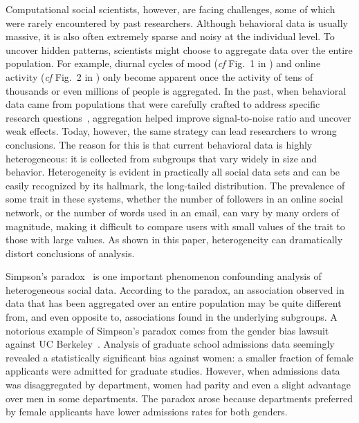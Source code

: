 \documentclass{svjour3}
\begin{document}
Computational social scientists, however, are facing challenges, some of which were rarely encountered by past researchers. %
Although behavioral data is usually massive, it is also often extremely sparse and noisy at the individual level. To uncover hidden patterns, %
scientists might choose to aggregate data over the entire population. For example, diurnal cycles of mood (\emph{cf} Fig.~1 in \cite{golder2011diurnal}) and online activity (\emph{cf} Fig.~2 in \cite{Hogg12epj}) only become apparent once the activity of tens of thousands or even millions of people is aggregated.
In the past, when behavioral data came from populations that were carefully crafted to address specific research questions~\cite{mcfarland2016sociology}, aggregation helped improve signal-to-noise ratio and uncover weak effects.
Today, however, the same strategy can lead researchers to wrong conclusions.
The reason for this is that current behavioral data is highly heterogeneous: it is collected from subgroups that vary widely in size and behavior.
Heterogeneity is evident in practically all social data sets and can be easily recognized by its hallmark, the long-tailed distribution. The prevalence of some trait in these systems, whether the number of followers in an online social network, or the number of words used in an email, can vary by many orders of magnitude, making it difficult to compare users with small values of the trait to those with large values.
As shown in this paper, heterogeneity can dramatically distort conclusions of analysis.


Simpson's paradox~\cite{Blyth1972,Norton2015simpson} is one important phenomenon confounding analysis of heterogeneous social data.
According to the paradox, an association observed in data that has been aggregated over an entire population may be quite different from, and even opposite to, associations found in the underlying subgroups.
A notorious example of Simpson's paradox comes from the gender bias lawsuit against UC Berkeley~\cite{Bickel1975}. Analysis of graduate school admissions data seemingly revealed a statistically significant bias against women: a smaller fraction of female applicants were admitted for graduate studies. However, when admissions data was disaggregated by department, women had parity and even a slight advantage over men in some departments. The paradox arose because departments preferred by female applicants have lower admissions rates for both genders.
\end{document}
